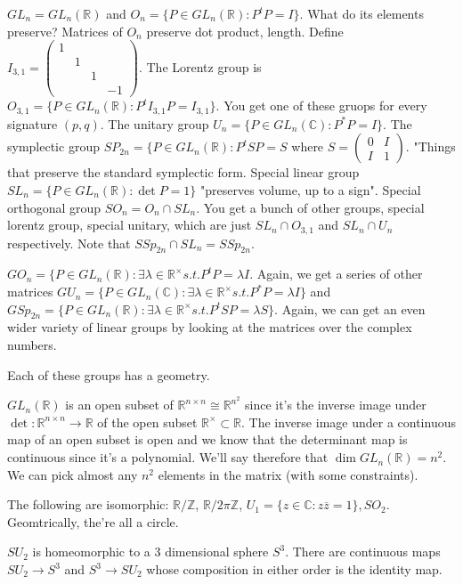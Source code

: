 \documentclass{article}
\newcommand{\C}{\mathbb{C}}
\newcommand{\R}{\mathbb{R}}
\newcommand{\Z}{\mathbb{Z}}
\newcommand{\ra}[1][]{\xrightarrow{#1}}
\begin{document}
\begin{example}
$GL_n=GL_n(\R)$ and $O_n=\{P\in GL_n(\R):P^tP=I\}$. What do its elements preserve? Matrices of $O_n$ preserve dot product, length. Define $I_{3,1}=\begin{pmatrix}1&&&\\&1&&\\&&1&\\&&&-1\end{pmatrix}$. The Lorentz group is $O_{3,1}=\{P\in GL_n(\R):P^tI_{3,1}P=I_{3,1}\}.$ You get one of these gruops for every signature $(p,q)$. The unitary group $U_n=\{P\in GL_n(\C):P^*P=I\}$. The symplectic group $SP_{2n}=\{P\in GL_n(\R):P^tSP=S$ where $S=\begin{pmatrix}0&I\\I&1\end{pmatrix}$. "Things that preserve the standard symplectic form. Special linear group $SL_n=\{P\in GL_n(\R): \det P=1\}$ "preserves volume, up to a sign". Special orthogonal group $SO_n=O_n\cap SL_n$. You get a bunch of other groups, special lorentz group, special unitary, which are just $SL_n\cap O_{3,1}$ and $SL_n\cap U_n$ respectively. Note that $SSp_{2n}\cap SL_n=SSp_{2n}$.  
\end{example}
\begin{example}
$GO_n=\{P\in GL_n(\R):\exists \lambda\in \R^\times s.t. P^tP=\lambda I$. Again, we get a series of other matrices $GU_n=\{P\in GL_n(\C):\exists \lambda\in \R^\times s.t. P^*P=\lambda I\}$ and $GSp_{2n}=\{P\in GL_n(\R):\exists \lambda\in\R^\times s.t. P^tSP=\lambda S\}$. Again, we can get an even wider variety of linear groups by looking at the matrices over the complex numbers.
\end{example}

Each of these groups has a geometry.
\begin{example}
$GL_n(\R)$ is an open subset of $\R^{n\times n}\cong \R^{n^2}$ since it's the inverse image under $\det:\R^{n\times n}\ra\R$ of the open subset $\R^\times \subset \R$. The inverse image under a continuous map of an open subset is open and we know that the determinant map is continuous since it's a polynomial. We'll say therefore that $\dim GL_n(\R)=n^2$. We can pick almost any $n^2$ elements in the matrix (with some constraints). 
\end{example}
\begin{example}
The following are isomorphic: $\R/\Z$, $\R/2\pi\Z$, $U_1=\{z\in\C:z\overline{z}=1\},SO_2$. Geomtrically, the're all a circle.
\end{example}
\begin{example}
$SU_2$ is homeomorphic to a 3 dimensional sphere $S^3$. There are continuous maps $SU_2\ra S^3$ and $S^3\ra SU_2$ whose composition in either order is the identity map.
\end{example}
\end{document}
